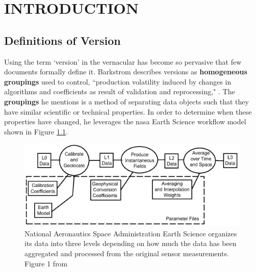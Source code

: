 
\chapter{INTRODUCTION}

\section{Definitions of Version} \label{sec:def}

Using the term `version' in the vernacular has become so pervasive that few documents formally define it.
Barkstrom describes versions as \textbf{homogeneous groupings} used to control, ``production volatility induced by changes in algorithms and coefficients as result of validation and reprocessing," \cite{Barkstrom2003}.
The \textbf{groupings} he mentions is a method of separating data objects such that they have similar scientific or technical properties.
In order to determine when these properties have changed, he leverages the \gls{nasa} Earth Science workflow model shown in Figure \ref{NASALevels}.
\begin{figure}
	\centering
	\includegraphics[scale=0.35]{figures/NASALevels.png}
	\caption[National Aeronautics and Space Administration Earth Science organizes its data into three levels depending on how much the data has been aggregated and processed from the original sensor measurements.]{National Aeronautics Space Administration Earth Science organizes its data into three levels depending on how much the data has been aggregated and processed from the original sensor measurements. Figure 1 from \cite{Barkstrom2003}}
	\label{NASALevels}
\end{figure}

